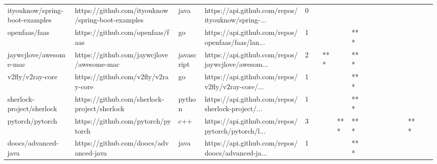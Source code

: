 \begin{tabular}{llllrlllllllllllll}
ityouknow/spring-boot-examples                     &  https://github.com/ityouknow/spring-boot-examples &              java &  https://api.github.com/repos/ityouknow/spring-... &       0 &         &        &           &                &                 &        &           &           &          &          &       &              &          \\
openfaas/faas                                      &                   https://github.com/openfaas/faas &                go &  https://api.github.com/repos/openfaas/faas/lan... &       1 &         &        &           &            *** &                 &        &           &           &          &          &       &              &          \\
jaywcjlove/awesome-mac                             &          https://github.com/jaywcjlove/awesome-mac &        javascript &  https://api.github.com/repos/jaywcjlove/awesom... &       2 &         &    *** &           &            *** &                 &        &           &           &          &          &       &              &          \\
v2fly/v2ray-core                                   &                https://github.com/v2fly/v2ray-core &                go &  https://api.github.com/repos/v2fly/v2ray-core/... &       1 &         &        &           &            *** &                 &        &           &           &          &          &       &              &          \\
sherlock-project/sherlock                          &       https://github.com/sherlock-project/sherlock &            python &  https://api.github.com/repos/sherlock-project/... &       1 &         &        &           &            *** &                 &        &           &           &          &          &       &              &          \\
pytorch/pytorch                                    &                 https://github.com/pytorch/pytorch &               c++ &  https://api.github.com/repos/pytorch/pytorch/l... &       3 &         &        &       *** &            *** &                 &        &           &           &          &          &   *** &              &          \\
doocs/advanced-java                                &             https://github.com/doocs/advanced-java &              java &  https://api.github.com/repos/doocs/advanced-ja... &       1 &         &        &           &            *** &                 &        &           &           &          &          &       &              &          \\

\end{tabular}
